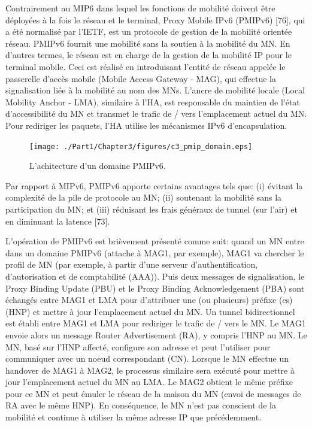 Contrairement au MIP6 dans lequel les fonctions de mobilité doivent être déployées à la fois le réseau et le terminal, Proxy Mobile IPv6 (PMIPv6) [76], qui a été normalisé par l'IETF, est un protocole de gestion de la mobilité orientée réseau. PMIPv6 fournit une mobilité sans la soutien à la mobilité du MN. En d'autres termes, le réseau est en charge de la gestion de la mobilité IP pour le terminal mobile. Ceci est réalisé en introduisant l'entité de réseau appelée le passerelle d'accès mobile (Mobile Access Gateway - MAG), qui effectue la signalisation liée à la mobilité au nom des MNs. L'ancre de mobilité locale (Local Mobility Anchor - LMA), similaire à l'HA, est responsable du maintien de l'état d'accessibilité du MN et transmet le trafic de / vers l'emplacement actuel du MN. Pour rediriger les paquets, l'HA utilise les mécanismes IPv6 d'encapsulation.

\begin{figure}[h!] 
 \begin{center} 
 \texttt{[image: ./Part1/Chapter3/figures/c3\_pmip\_domain.eps]} 
    \caption[L'achitecture d'un domaine PMIPv6]{L'achitecture d'un domaine PMIPv6.}
     \label{fig:c3_pmip_domain}
  \end{center} 
\end{figure}

Par rapport à MIPv6, PMIPv6 apporte certains avantages tels que: (i) évitant la complexité de la pile de protocole au MN; (ii) soutenant la mobilité sans la participation du MN; et (iii) réduisant les frais généraux de tunnel (sur l'air) et en diminuant la latence [73].

L'opération de PMIPv6 est brièvement présenté comme suit: quand un MN entre dans un domaine PMIPv6 (attache à MAG1, par exemple), MAG1 va chercher le profil de MN (par exemple, à partir d'une serveur d'authentification, d'autorisation et de comptabilité (AAA)). Puis deux messages de signalisation, le Proxy Binding Update (PBU) et le Proxy Binding Acknowledgement (PBA) sont échangés entre MAG1 et LMA pour d'attribuer une (ou plusieurs) préfixe (es) (HNP) et mettre à jour l'emplacement actuel du MN. Un tunnel bidirectionnel est établi entre MAG1 et LMA pour rediriger le trafic de / vers le MN. Le MAG1 envoie alors un message Router Advertisement (RA), y compris l'HNP au MN. Le MN, basé sur l'HNP affecté, configure son adresse et peut l'utiliser pour communiquer avec un noeud correspondant (CN). Lorsque le MN effectue un handover de MAG1 à MAG2, le processus similaire sera exécuté pour mettre à jour l'emplacement actuel du MN au LMA. Le MAG2 obtient le même préfixe pour ce MN et peut émuler le réseau de la maison du MN (envoi de messages de RA avec le même HNP). En conséquence, le MN n'est pas conscient de la mobilité et continue à utiliser la même adresse IP que précédemment.


